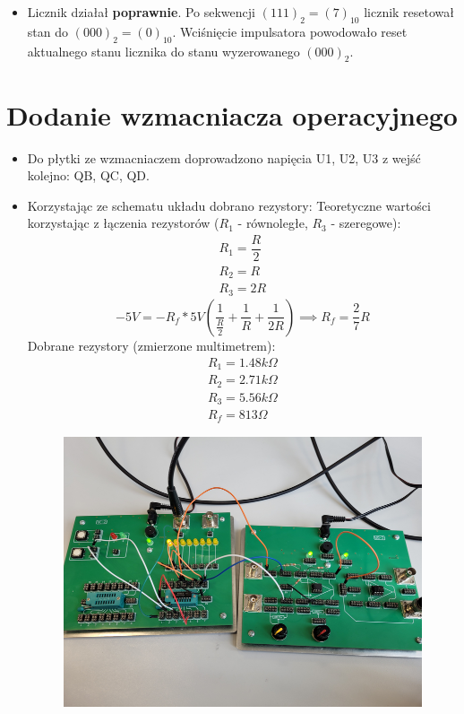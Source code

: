 \begin{itemize}
    \item Licznik działał \textbf{poprawnie}. Po sekwencji $(111)_2 = (7)_{10}$ licznik resetował stan do $(000)_2 = (0)_{10}$. Wciśnięcie impulsatora powodowało reset aktualnego stanu licznika do stanu wyzerowanego $(000)_2$.
\end{itemize}

\section{Dodanie wzmacniacza operacyjnego}

\begin{itemize}
    \item Do płytki ze wzmacniaczem doprowadzono napięcia U1, U2, U3 z wejść kolejno: QB, QC, QD.
    \item Korzystając ze schematu układu dobrano rezystory:
        Teoretyczne wartości korzystając z łączenia rezystorów ($R_1$ - równoległe, $R_3$ - szeregowe):
        \begin{gather}
            R_1 = \dfrac{R}{2} \\
            R_2 = R \\
            R_3 = 2R
        \end{gather}
        \begin{equation}
            -5V = -R_f * 5V(\dfrac{1}{\frac{R}{2}}+\dfrac{1}{R}+\dfrac{1}{2R}) \implies R_f = \dfrac{2}{7}R
        \end{equation}
        Dobrane rezystory (zmierzone multimetrem):
        \begin{gather}
            R_1 = 1.48k\Omega \\
            R_2 = 2.71k\Omega \\
            R_3 = 5.56k\Omega \\
            R_f = 813\Omega
        \end{gather}
        \begin{figure}[H]
            \centering
            \includegraphics[width=\textwidth]{img/2/20220608_100038_scaled.png}

\end{figure}
\end{itemize}
